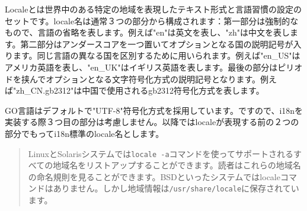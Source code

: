 Localeとは世界中のある特定の地域を表現したテキスト形式と言語習慣の設定のセットです。locale名は通常３つの部分から構成されます：第一部分は強制的なもので、言語の省略を表します。例えば"en"は英文を表し、"zh"は中文を表します。第二部分はアンダースコアを一つ置いてオプションとなる国の説明記号が入ります。同じ言語の異なる国を区別するために用いられます。例えば"en\_US"はアメリカ英語を表し、"en\_UK"はイギリス英語を表します。最後の部分はピリオドを挟んでオプションとなる文字符号化方式の説明記号となります。例えば"zh\_CN.gb2312"は中国で使用されるgb2312符号化方式を表します。

GO言語はデフォルトで"UTF-8"符号化方式を採用しています。ですので、i18nを実装する際３つ目の部分は考慮しません。以降ではlocaleが表現する前の２つの部分でもってi18n標準のlocale名とします。

\begin{quote}
LinuxとSolarisシステムでは\texttt{locale -a}コマンドを使ってサポートされるすべての地域名をリストアップすることができます。読者はこれらの地域名の命名規則を見ることができます。BSDといったシステムではlocaleコマンドはありません。しかし地域情報は\texttt{/usr/share/locale}に保存されています。
\end{quote}
